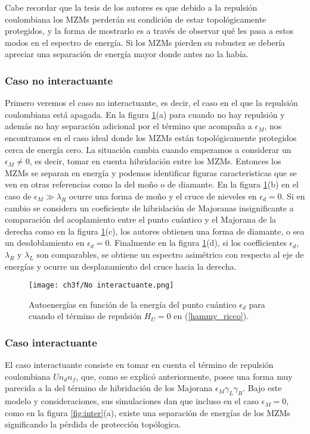 Cabe recordar que la tesis de los autores es que debido a la repulsi\'{o}n coulombiana los MZMs perder\'{a}n su condici\'{o}n de estar topol\'{o}gicamente protegidos, y la forma de mostrarlo es a trav\'{e}s de observar qu\'{e} les pasa a estos modos en el espectro de energ\'{i}a. Si los MZMs pierden su robustez se deber\'{i}a apreciar una separaci\'{o}n de energ\'{i}a mayor donde antes no la hab\'{i}a.
%
%
\subsubsection{Caso no interactuante}
Primero veremos el caso no interactuante, es decir, el caso en el que la repulsi\'{o}n coulombiana est\'{a} apagada. En la figura \ref{fig:nointer}(a) para cuando no hay repulsi\'{o}n y adem\'{a}s no hay separaci\'{o}n adicional por el t\'{e}rmino que acompa\~{n}a a $\epsilon_M$, nos encontramos en el caso ideal donde los MZMs est\'{a}n topol\'{o}gicamente protegidos cerca de energ\'{i}a cero. La situaci\'{o}n cambia cuando empezamos a considerar un $\epsilon_M\neq 0$, es decir, tomar en cuenta hibridaci\'{o}n entre los MZMs. Entonces los MZMs se separan en energ\'{i}a y podemos identificar figuras caracteristicas que se ven en otras referencias como la del mo\~{n}o o de diamante. En la figura \ref{fig:nointer}(b) en el caso de $\epsilon_M\gg \lambda_R$ ocurre una forma de mo\~{n}o y el cruce de nieveles en $\epsilon_d=0$. Si en cambio se considera un coeficiente de hibridaci\'{o}n de Majoranas insignificante a comparaci\'{o}n del acoplamiento entre el punto cu\'{a}ntico y el Majorana de la derecha como en la figura \ref{fig:nointer}(c), los autores obtienen una forma de diamante, o sea un desdoblamiento en $\epsilon_d=0$. Finalmente en la figura \ref{fig:nointer}(d), si los coefficientes $\epsilon_d$, $\lambda_R$ y $\lambda_L$ son comparables, se obtiene un espectro asim\'{e}trico con respecto al eje de energ\'{i}as y ocurre un desplazamiento del cruce hacia la derecha.   
%
\begin{figure}[t]
    \centering
    \texttt{[image: ch3f/No interactuante.png]}
    \caption{Autoenergías en función de la energía del punto cuántico $\epsilon_d$ para cuando el t\'{e}rmino de repulsi\'{o}n $H_U=0$ en (\ref{hammy_ricco}).}
    \label{fig:nointer}
\end{figure}
%
%
\subsubsection{Caso interactuante}
El caso interactuante consiste en tomar en cuenta el t\'{e}rmino de repulsi\'{o}n coulombiana $Un_dn_f$, que, como se explic\'{o} anteriormente, posee una forma muy parecida a la del t\'{e}rmino de hibridaci\'{o}n de los Majorana $\epsilon_M\gamma_L\gamma_R$. Bajo este modelo y consideraciones, sus simulaciones dan que incluso en el caso $\epsilon_M=0$, como en la figura \ref{fig:inter}(a), existe una separaci\'{o}n de energ\'{i}as de los MZMs significando la p\'{e}rdida de protecci\'{o}n top\'{o}logica.

